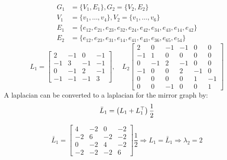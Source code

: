 \begin{equation}
  \begin{split}
    G_1 & = \{ V_1,E_1 \}, G_2 = \{ V_2,E_2 \}                                          \\
    V_1 & = \{ v_1,\ldots,v_4 \}, V_2 = \{ v_1,\ldots,v_6 \}                            \\
    E_1 & = \{ e_{12},e_{21},e_{23},e_{32},e_{24},e_{42},e_{34},e_{43},e_{14},e_{42} \} \\
    E_2 & = \{e_{12},e_{23},e_{31},e_{14},e_{41},e_{43},e_{36},e_{65},e_{54}\}
  \end{split}
\end{equation}
\begin{equation}
  L_1 = 
  \begin{bmatrix}
    2   & -1 & 0  & -1                                                                  \\
    -1  & 3  & -1 & -1                                                                  \\
    0   & -1 & 2  & -1                                                                  \\
    -1  & -1 & -1 & 3
  \end{bmatrix},\quad
  L_2
  \begin{bmatrix}
    2   & 0  & -1 & -1 & 0  & 0                                                         \\
    -1  & 1  & 0  & 0  & 0  & 0                                                         \\
    0   & -1 & 2  & -1 & 0  & 0                                                         \\
    -1  & 0  & 0  & 2  & -1 & 0                                                         \\
    0   & 0  & 0  & 0  & 1  & -1                                                        \\
    0   & 0  & -1 & 0  & 0  & 1
  \end{bmatrix}
\end{equation}
A laplacian can be converted to a laplacian for the mirror graph by:
\begin{equation}
  \bar{L}_1 = \left( L_1 + L_1^\top \right)\frac{1}{2}
\end{equation}

\begin{equation}
  \bar{L}_1 =
  \begin{bmatrix}
    4 & -2 & 0 & -2 \\
    -2 & 6 & -2 & -2 \\
    0 & -2 & 4 & -2 \\
    -2 & -2 & -2 & 6
  \end{bmatrix}
  \frac{1}{2} \Rightarrow L_1 = \bar{L}_1 \Rightarrow \lambda_2 = 2
\end{equation}

